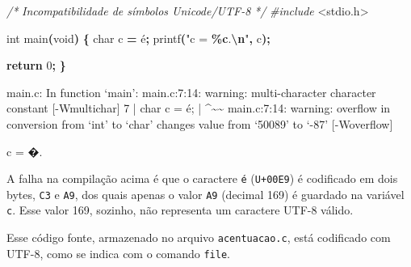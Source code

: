 \documentclass[
  11pt,
  a4paper,
]{scrbook}
\newenvironment{Shaded}{\begin{snugshade}}{\end{snugshade}}
\newcommand{\CharTok}[1]{\textcolor[rgb]{0.31,0.60,0.02}{#1}}
\newcommand{\CommentTok}[1]{\textcolor[rgb]{0.56,0.35,0.01}{\textit{#1}}}
\newcommand{\ControlFlowTok}[1]{\textcolor[rgb]{0.13,0.29,0.53}{\textbf{#1}}}
\newcommand{\DataTypeTok}[1]{\textcolor[rgb]{0.13,0.29,0.53}{#1}}
\newcommand{\DecValTok}[1]{\textcolor[rgb]{0.00,0.00,0.81}{#1}}
\newcommand{\ImportTok}[1]{#1}
\newcommand{\KeywordTok}[1]{\textcolor[rgb]{0.13,0.29,0.53}{\textbf{#1}}}
\newcommand{\NormalTok}[1]{#1}
\newcommand{\OperatorTok}[1]{\textcolor[rgb]{0.81,0.36,0.00}{\textbf{#1}}}
\newcommand{\PreprocessorTok}[1]{\textcolor[rgb]{0.56,0.35,0.01}{\textit{#1}}}
\newcommand{\SpecialCharTok}[1]{\textcolor[rgb]{0.81,0.36,0.00}{\textbf{#1}}}
\newcommand{\StringTok}[1]{\textcolor[rgb]{0.31,0.60,0.02}{#1}}
\begin{document}
\begin{Shaded}
\begin{Highlighting}[]
\CommentTok{/*}
\CommentTok{Incompatibilidade de símbolos Unicode/UTF{-}8}
\CommentTok{*/}
\PreprocessorTok{\#include }\ImportTok{\textless{}stdio.h\textgreater{}}

\DataTypeTok{int}\NormalTok{ main}\OperatorTok{(}\DataTypeTok{void}\OperatorTok{)} \OperatorTok{\{}
    \DataTypeTok{char}\NormalTok{ c }\OperatorTok{=} \CharTok{\textquotesingle{}é\textquotesingle{}}\OperatorTok{;}
\NormalTok{    printf}\OperatorTok{(}\StringTok{"c = }\SpecialCharTok{\%c}\StringTok{.}\SpecialCharTok{\textbackslash{}n}\StringTok{"}\OperatorTok{,}\NormalTok{ c}\OperatorTok{);}

    \ControlFlowTok{return} \DecValTok{0}\OperatorTok{;}
\OperatorTok{\}}
\end{Highlighting}
\end{Shaded}

\begin{Shaded}
\begin{Highlighting}[]
\NormalTok{main.c: In function ‘main’:}
\NormalTok{main.c:7:14: warning: multi{-}character character constant [{-}Wmultichar]}
\NormalTok{    7 |     char c = \textquotesingle{}é\textquotesingle{};}
\NormalTok{      |              \^{}\textasciitilde{}\textasciitilde{}}
\NormalTok{main.c:7:14: warning: overflow in conversion from ‘int’ to ‘char’ }
\NormalTok{changes value from ‘50089’ to ‘{-}87’ [{-}Woverflow]}
\end{Highlighting}
\end{Shaded}

\begin{Shaded}
\begin{Highlighting}[]
\NormalTok{c = �.}
\end{Highlighting}
\end{Shaded}

A falha na compilação acima é que o caractere \texttt{é}
(\texttt{U+00E9}) é codificado em dois bytes, \texttt{C3} e \texttt{A9},
dos quais apenas o valor \texttt{A9} (decimal 169) é guardado na
variável \texttt{c}. Esse valor 169, sozinho, não representa um
caractere UTF-8 válido.

Esse código fonte, armazenado no arquivo \texttt{acentuacao.c}, está
codificado com UTF-8, como se indica com o comando \texttt{file}.

\begin{Shaded}
\end{Shaded}
\end{document}
